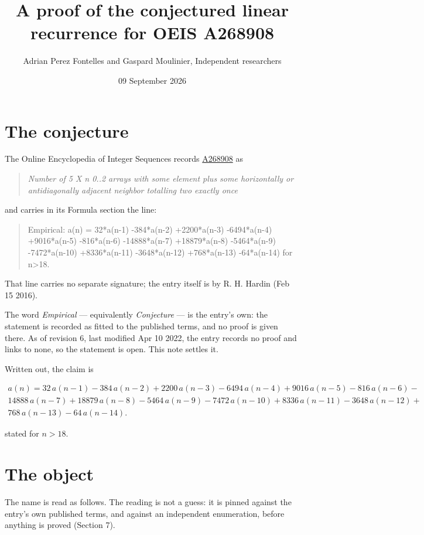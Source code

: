 \documentclass[11pt]{article}
\title{A proof of the conjectured linear recurrence for OEIS A268908}
\author{Adrian Perez Fontelles and Gaspard Moulinier, Independent researchers}
\date{09 September 2026}
\theoremstyle{definition}
\begin{document}
\maketitle
\section{The conjecture}

The Online Encyclopedia of Integer Sequences records \href{https://oeis.org/A268908}{A268908} as

\begin{quote}\itshape Number of 5 X n 0..2 arrays with some element plus some horizontally or antidiagonally adjacent neighbor totalling two exactly once\end{quote}

and carries in its Formula section the line:

\begin{quote}\ttfamily Empirical: a(n) = 32*a(n-1) -384*a(n-2) +2200*a(n-3) -6494*a(n-4) +9016*a(n-5) -816*a(n-6) -14888*a(n-7) +18879*a(n-8) -5464*a(n-9) -7472*a(n-10) +8336*a(n-11) -3648*a(n-12) +768*a(n-13) -64*a(n-14) for n>18.\end{quote}

That line carries no separate signature; the entry itself is by R. H. Hardin (Feb 15 2016).

The word {\itshape Empirical} --- equivalently {\itshape Conjecture} --- is the entry's own: the statement is recorded as fitted to the published terms, and no proof is given there. As of revision 6, last modified Apr 10 2022, the entry records no proof and links to none, so the statement is open. This note settles it.

Written out, the claim is

\begin{multline*} a(n) = 32\,a(n-1) - 384\,a(n-2) + 2200\,a(n-3) - 6494\,a(n-4) + 9016\,a(n-5) - 816\,a(n-6) - \\ 14888\,a(n-7) + 18879\,a(n-8) - 5464\,a(n-9) - 7472\,a(n-10) + 8336\,a(n-11) - 3648\,a(n-12) + \\ 768\,a(n-13) - 64\,a(n-14). \end{multline*}

stated for $n > 18$.

\section{The object}

The name is read as follows. The reading is not a guess: it is pinned against the entry's own published terms, and against an independent enumeration, before anything is proved (Section 7).
\end{document}
